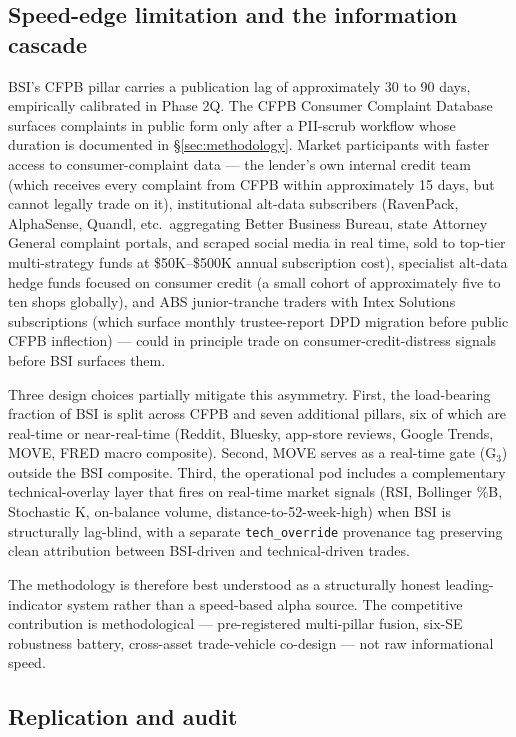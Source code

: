 \documentclass[11pt,a4paper]{article}
\begin{document}
\subsection{Speed-edge limitation and the information cascade}\label{sec:lim_speed}

BSI's CFPB pillar carries a publication lag of approximately 30 to 90 days, empirically calibrated in Phase 2Q. The CFPB Consumer Complaint Database surfaces complaints in public form only after a PII-scrub workflow whose duration is documented in §\ref{sec:methodology}. Market participants with faster access to consumer-complaint data --- the lender's own internal credit team (which receives every complaint from CFPB within approximately 15 days, but cannot legally trade on it), institutional alt-data subscribers (RavenPack, AlphaSense, Quandl, etc.\ aggregating Better Business Bureau, state Attorney General complaint portals, and scraped social media in real time, sold to top-tier multi-strategy funds at \$50K--\$500K annual subscription cost), specialist alt-data hedge funds focused on consumer credit (a small cohort of approximately five to ten shops globally), and ABS junior-tranche traders with Intex Solutions subscriptions (which surface monthly trustee-report DPD migration before public CFPB inflection) --- could in principle trade on consumer-credit-distress signals before BSI surfaces them.

Three design choices partially mitigate this asymmetry. First, the load-bearing fraction of BSI is split across CFPB and seven additional pillars, six of which are real-time or near-real-time (Reddit, Bluesky, app-store reviews, Google Trends, MOVE, FRED macro composite). Second, MOVE serves as a real-time gate (G$_3$) outside the BSI composite. Third, the operational pod includes a complementary technical-overlay layer that fires on real-time market signals (RSI, Bollinger \%B, Stochastic K, on-balance volume, distance-to-52-week-high) when BSI is structurally lag-blind, with a separate \texttt{tech\_override} provenance tag preserving clean attribution between BSI-driven and technical-driven trades.

The methodology is therefore best understood as a structurally honest leading-indicator system rather than a speed-based alpha source. The competitive contribution is methodological --- pre-registered multi-pillar fusion, six-SE robustness battery, cross-asset trade-vehicle co-design --- not raw informational speed.

\subsection{Replication and audit}
\end{document}
